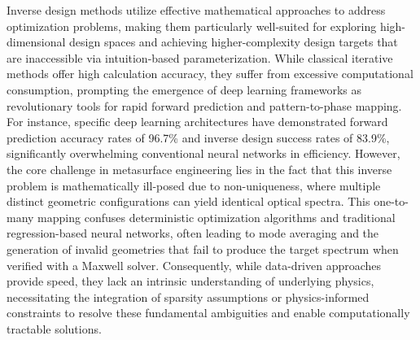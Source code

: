 Inverse design methods utilize effective mathematical approaches to address optimization problems, making them particularly well-suited for exploring high-dimensional design spaces and achieving higher-complexity design targets that are inaccessible via intuition-based parameterization. While classical iterative methods offer high calculation accuracy, they suffer from excessive computational consumption, prompting the emergence of deep learning frameworks as revolutionary tools for rapid forward prediction and pattern-to-phase mapping. For instance, specific deep learning architectures have demonstrated forward prediction accuracy rates of 96.7\% and inverse design success rates of 83.9\%, significantly overwhelming conventional neural networks in efficiency. However, the core challenge in metasurface engineering lies in the fact that this inverse problem is mathematically ill-posed due to non-uniqueness, where multiple distinct geometric configurations can yield identical optical spectra. \citep{doi_10_30560_ijas_v9n1p1_31843ad0} \citep{doi_10_1364_oe_419138_33b8279d} This one-to-many mapping confuses deterministic optimization algorithms and traditional regression-based neural networks, often leading to mode averaging and the generation of invalid geometries that fail to produce the target spectrum when verified with a Maxwell solver. Consequently, while data-driven approaches provide speed, they lack an intrinsic understanding of underlying physics, necessitating the integration of sparsity assumptions or physics-informed constraints to resolve these fundamental ambiguities and enable computationally tractable solutions. \citep{doi_10_1088_1361_6439_ad3a72_72d60f33} \citep{doi_10_1016_j_rio_2026_100988_b00ee173} \citep{doi_10_1515_nanoph_2019_0474_d2187501} \citep{doi_10_71465_fapm546_bda368a5}

